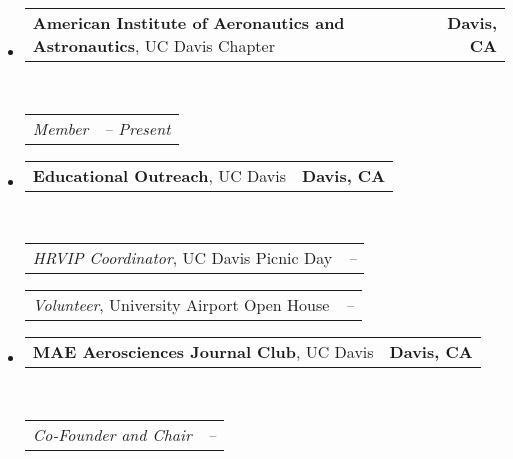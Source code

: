 \documentclass[10pt,letterpaper,MMMyyyy,nonstop]{simpleresumecv}
\makeatletter
\newcommand{\headerrow}[2]
{\begin{tabular*}{\linewidth}{l@{\extracolsep{\fill}}r}
    #1 &
    #2 \\
\end{tabular*}}
\makeatother
\begin{document}
\begin{itemize}
    \parskip=0.1em

    \item
        \headerrow
        {\textbf{American Institute of Aeronautics and Astronautics}, UC Davis Chapter}
        {\textbf{Davis, CA}}
        \\
        \headerrow
        {\emph{Member}}
        {\emph{\DatestampY{2011} -- Present}}


    \item
        \headerrow
        {\textbf{Educational Outreach}, UC Davis}
        {\textbf{Davis, CA}}
        \\
        \headerrow
        {\emph{HRVIP Coordinator}, UC Davis Picnic Day}
        {\emph{\DatestampY{2014} -- \DatestampY{2019}}}

        \headerrow
        {\emph{Volunteer}, University Airport Open House}
        {\emph{\DatestampY{2014} -- \DatestampY{2017}}}

    \item
        \headerrow
        {\textbf{MAE Aerosciences Journal Club}, UC Davis}
        {\textbf{Davis, CA}}
        \\
        \headerrow
        {\emph{Co-Founder and Chair}}
        {\emph{\DatestampY{2016} -- \DatestampY{2018}}}


\end{itemize}
\end{document}
